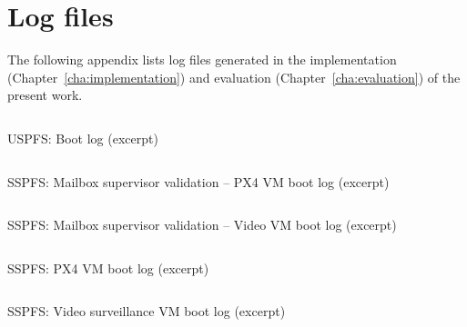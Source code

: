 %

\chapter{Log files}
\label{app:log_files}

The following appendix lists log files generated in the
implementation (Chapter~\ref{cha:implementation}) and evaluation
(Chapter~\ref{cha:evaluation}) of the present work.

\begin{longlisting}
\centering
\inputminted[]{kconfig}{./listing/boot-uspfs.txt}
\caption{USPFS: Boot log (excerpt)}
\label{lst:uspfs-boot}
\end{longlisting}

\begin{longlisting}
\centering
\inputminted[]{kconfig}{./listing/rpi-fw-validation-1.txt}
\caption{SSPFS: Mailbox supervisor validation -- PX4 VM boot log (excerpt)}
\label{lst:rpi-fw-validation-1}
\end{longlisting}

\begin{longlisting}
\centering
\inputminted[]{kconfig}{./listing/rpi-fw-validation-2.txt}
\caption{SSPFS: Mailbox supervisor validation -- Video VM boot log (excerpt)}
\label{lst:rpi-fw-validation-2}
\end{longlisting}

\begin{longlisting}
\centering
\inputminted[]{kconfig}{./listing/sspfs-boot-px4.txt}
\caption{SSPFS: PX4 VM boot log (excerpt)}
\label{lst:sspfs-boot-px4}
\end{longlisting}

\begin{longlisting}
\centering
\inputminted[]{kconfig}{./listing/sspfs-boot-cam.txt}
\caption{SSPFS: Video surveillance VM boot log (excerpt)}
\label{lst:sspfs-boot-cam}
\end{longlisting}


